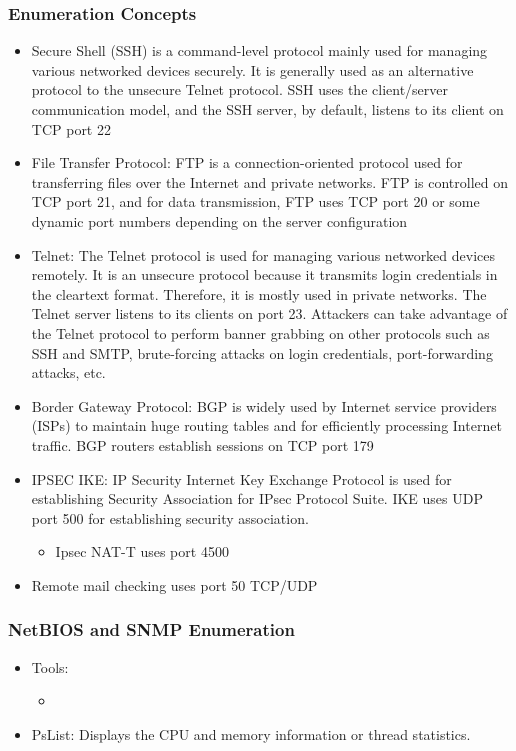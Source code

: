 \subsubsection{Enumeration Concepts}
\begin{itemize}
    \item Secure Shell (SSH) is a command-level protocol mainly used for managing various networked devices securely. It is generally used as an alternative protocol to the unsecure Telnet protocol. SSH uses the client/server communication model, and the SSH server, by default, listens to its client on TCP port 22
    \item File Transfer Protocol: FTP is a connection-oriented protocol used for transferring files over the Internet and private networks. FTP is controlled on TCP port 21, and for data transmission, FTP uses TCP port 20 or some dynamic port numbers depending on the server configuration
    \item Telnet: The Telnet protocol is used for managing various networked devices remotely. It is an unsecure protocol because it transmits login credentials in the cleartext format. Therefore, it is mostly used in private networks. The Telnet server listens to its clients on port 23. Attackers can take advantage of the Telnet protocol to perform banner grabbing on other protocols such as SSH and SMTP, brute-forcing attacks on login credentials, port-forwarding attacks, etc.
    \item Border Gateway Protocol: BGP is widely used by Internet service providers (ISPs) to maintain huge routing tables and for efficiently processing Internet traffic. BGP routers establish sessions on TCP port 179
    \item IPSEC IKE: IP Security Internet Key Exchange Protocol is used for establishing Security Association for IPsec Protocol Suite. IKE uses UDP port 500 for establishing security association.
    \begin{itemize}
        \item Ipsec NAT-T uses port 4500
    \end{itemize}
    \item Remote mail checking uses port 50 TCP/UDP
\end{itemize}
\subsubsection{NetBIOS and SNMP Enumeration}
\begin{itemize}
    \item Tools:
    \begin{itemize}
        \item 
    \end{itemize}
    \item PsList: Displays the CPU and memory information or thread statistics.
\end{itemize}

